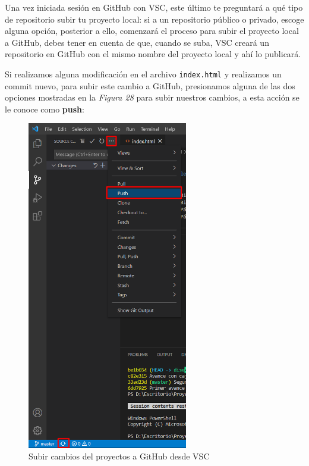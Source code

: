 Una vez iniciada sesión en GitHub con VSC, este último te preguntará a qué tipo de repositorio subir tu proyecto local: si a un repositorio público o privado, escoge alguna opción, posterior a ello, comenzará el proceso para subir el proyecto local a GitHub, debes tener en cuenta de que, cuando se suba, VSC creará un repositorio en GitHub con el mismo nombre del proyecto local y ahí lo publicará.

Si realizamos alguna modificación en el archivo \texttt{index.html} y realizamos un commit nuevo, para subir este cambio a GitHub, presionamos alguna de las dos opciones mostradas en la \textit{Figura 28} para subir nuestros cambios, a esta acción se le conoce como \textbf{push}:
\begin{figure}[H]
    \begin{center}
        \caption{Subir cambios del proyectos a GitHub desde VSC}
        \label{fig: 28}
        \includegraphics[width=7cm]{capturas/subir_proyecto2.png}
    \end{center}
\end{figure}

